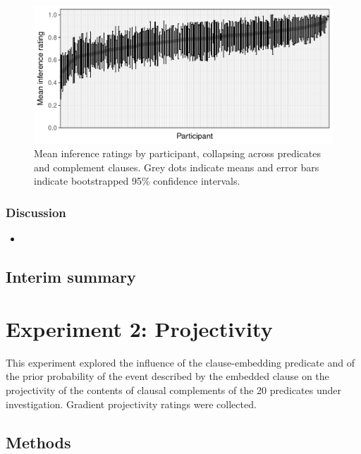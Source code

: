 \documentclass[11pt,fleqn]{article}
\newcommand{\6}{\mbox{$[\hspace*{-.6mm}[$}}
\newcommand{\9}{\mbox{$]\hspace*{-.6mm}]$}}
\begin{document}
\begin{figure}[h!]
\centering

\includegraphics[width=.8\paperwidth]{../results/4-veridicality3/graphs/inference-subjmeans}

\caption{Mean inference ratings by participant, collapsing across predicates and complement clauses. Grey dots indicate means and error bars indicate bootstrapped 95\% confidence intervals.}
\label{f-contradict-participant2}
\end{figure}

\subsubsection{Discussion}

\begin{itemize}

\item 

\end{itemize}

\subsection{Interim summary}

\section{Experiment 2: Projectivity}

This experiment explored the influence of the clause-embedding predicate and of the prior probability of the event described by the embedded clause on the projectivity of the contents of clausal complements of the 20 predicates under investigation. Gradient projectivity ratings were collected.

\subsection{Methods}
\end{document}
